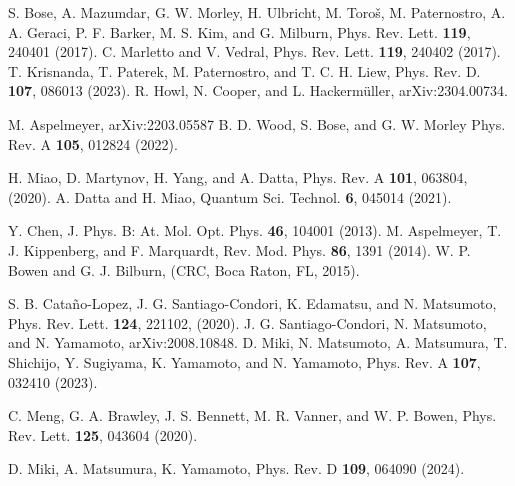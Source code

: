 \documentclass[twocolumn,superscriptaddress,aps,preprintnumbers,amsmath,amssymb,prl,nofootinbib]{revtex4}
\begin{document}
\begin{thebibliography}{}

S. Bose, A. Mazumdar, G. W. Morley, H. Ulbricht, M. Toro\v{s}, M. Paternostro, A. A. Geraci, P. F. Barker, M. S. Kim, and G. Milburn,
Phys. Rev. Lett. {\bf 119}, 240401 (2017).
C. Marletto and V. Vedral,
Phys. Rev. Lett. {\bf 119}, 240402 (2017).
T. Krisnanda, T. Paterek, M. Paternostro, and T. C. H. Liew,
Phys. Rev. D. {\bf 107}, 086013 (2023).
R. Howl, N. Cooper, and L. Hackerm\"{u}ller,
arXiv:2304.00734.


M. Aspelmeyer, arXiv:2203.05587
B. D. Wood, S. Bose, and G. W. Morley
Phys. Rev. A {\bf 105}, 012824  (2022).


H. Miao, D. Martynov, H. Yang, and A. Datta, 
Phys. Rev. A {\bf 101}, 063804, (2020).
A. Datta and H. Miao,
Quantum Sci. Technol. {\bf 6}, 045014 (2021).


Y. Chen,
J. Phys. B: At. Mol. Opt. Phys. {\bf 46}, 104001 (2013).
M. Aspelmeyer, T. J. Kippenberg, and F. Marquardt,
Rev. Mod. Phys. {\bf 86}, 1391 (2014).
W. P. Bowen and G. J. Bilburn,
(CRC, Boca Raton, FL, 2015).

S. B. Cata\~{n}o-Lopez, J. G. Santiago-Condori, K. Edamatsu, and N. Matsumoto, 
Phys. Rev. Lett. {\bf 124}, 221102, (2020).
J. G. Santiago-Condori, N. Matsumoto, and N. Yamamoto,
arXiv:2008.10848.
D. Miki, N. Matsumoto, A. Matsumura, T. Shichijo, Y. Sugiyama, K. Yamamoto, and N. Yamamoto,
Phys. Rev. A {\bf 107}, 032410 (2023).

C. Meng, G. A. Brawley, J. S. Bennett, M. R. Vanner, and W. P. Bowen,
Phys. Rev. Lett. {\bf 125}, 043604 (2020).

D. Miki, A. Matsumura, K. Yamamoto,
Phys. Rev. D {\bf 109}, 064090 (2024).


\end{thebibliography}
\end{document}

